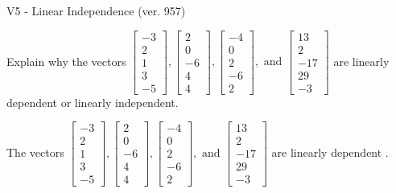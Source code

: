 \begin{exercise}
  \begin{exerciseTitle}V5 - Linear Independence (ver. 957)\end{exerciseTitle}
  \begin{exerciseStatement}
    Explain why the vectors \(\left[\begin{array}{r}
-3 \\
2 \\
1 \\
3 \\
-5
\end{array}\right] , \left[\begin{array}{r}
2 \\
0 \\
-6 \\
4 \\
4
\end{array}\right] , \left[\begin{array}{r}
-4 \\
0 \\
2 \\
-6 \\
2
\end{array}\right] , \text{ and } \left[\begin{array}{r}
13 \\
2 \\
-17 \\
29 \\
-3
\end{array}\right]\) are linearly dependent or linearly independent.	


  \end{exerciseStatement}
  \begin{exerciseAnswer}
   The vectors \(\left[\begin{array}{r}
-3 \\
2 \\
1 \\
3 \\
-5
\end{array}\right] , \left[\begin{array}{r}
2 \\
0 \\
-6 \\
4 \\
4
\end{array}\right] , \left[\begin{array}{r}
-4 \\
0 \\
2 \\
-6 \\
2
\end{array}\right] , \text{ and } \left[\begin{array}{r}
13 \\
2 \\
-17 \\
29 \\
-3
\end{array}\right]\) are 
  	 linearly dependent  .
  


  \end{exerciseAnswer}
\end{exercise}